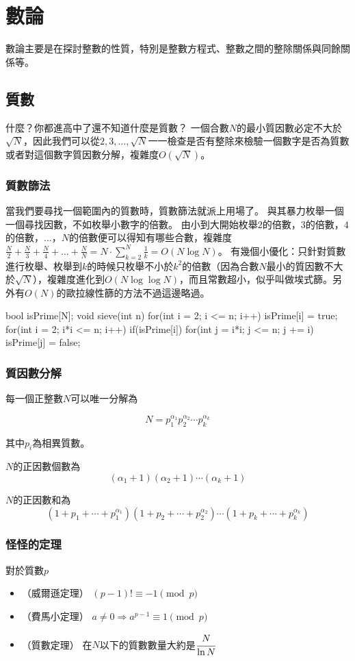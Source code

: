 \chapter{數論 \uppercase\expandafter{}}
數論主要是在探討整數的性質，特別是整數方程式、整數之間的整除關係與同餘關係等。

\section{質數}
什麼？你都進高中了還不知道什麼是質數？
一個合數$N$的最小質因數必定不大於$\sqrt{N}$，因此我們可以從$2,3,\dots,\sqrt{N}$一一檢查是否有整除來檢驗一個數字是否為質數或者對這個數字質因數分解，複雜度$O(\sqrt{N})$。

\subsection{質數篩法}
當我們要尋找一個範圍內的質數時，質數篩法就派上用場了。
與其暴力枚舉一個一個尋找因數，不如枚舉小數字的倍數。
由小到大開始枚舉$2$的倍數，$3$的倍數，$4$的倍數，$\dots$，$N$的倍數便可以得知有哪些合數，複雜度$\frac{N}{2}+\frac{N}{3}+\frac{N}{4}+\dots+\frac{N}{N} = N \cdot \sum_{k=2}^N \frac{1}{k} = O(N\log N)$。
有幾個小優化：只針對質數進行枚舉、枚舉到$k$的時候只枚舉不小於$k^2$的倍數（因為合數$N$最小的質因數不大於$\sqrt{N}$），複雜度進化到$O(N \log \log N)$，而且常數超小，似乎叫做埃式篩。另外有$O(N)$的歐拉線性篩的方法不過這邊略過。
\begin{C++}
bool isPrime[N];
void sieve(int n) {
	for(int i = 2; i <= n; i++) isPrime[i] = true;
	for(int i = 2; i*i <= n; i++) if(isPrime[i]) {
		for(int j = i*i; j <= n; j += i) {
			isPrime[j] = false;
		}
	}
}
\end{C++}

\subsection{質因數分解}
每一個正整數$N$可以唯一分解為

$$
N = p_1^{\alpha_1}p_2^{\alpha_2}\cdots p_k^{\alpha_k}
$$

其中$p_i$為相異質數。

$N$的正因數個數為
$$(\alpha_1+1)(\alpha_2+1)\cdots(\alpha_k+1)$$

$N$的正因數和為
$$(1+p_1+\cdots+p_1^{\alpha_1})(1+p_2+\cdots+p_2^{\alpha_2}) \cdots (1+p_k+\cdots+p_k^{\alpha_k})$$

\subsection{怪怪的定理}
對於質數$p$
\begin{itemize}
\item （威爾遜定理） $(p-1)! \equiv -1 \pmod p$
\item （費馬小定理） $a \neq 0 \Rightarrow a^{p-1} \equiv 1 \pmod p$
\item （質數定理） 在$N$以下的質數數量大約是$\cfrac{N}{\ln N}$
\end{itemize}

